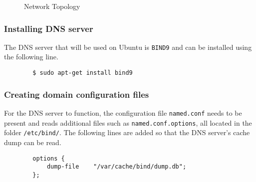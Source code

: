 \documentclass[a4paper,12pt]{article}
\begin{document}
\begin{figure}[H]
			\caption{Network Topology}
			\label{fig:Networksetup}
		\end{figure}
		\subsubsection{Installing DNS server}
		\begin{par} The DNS server that will be used on Ubuntu is \texttt{BIND9} and can be installed using the following line.
		\end{par}
		\begin{verbatim}
		$ sudo apt-get install bind9
		\end{verbatim}
		\subsubsection{Creating domain configuration files}
		\begin{par}
		For the DNS server to function, the configuration file \texttt{named.conf} needs to be present and reads additional files such as \texttt{named.conf.options}, all located in the folder \texttt{/etc/bind/}. The following lines are added so that the DNS server's cache dump can be read.
		\end{par}
		\begin{verbatim}
		options {
		    dump-file    "/var/cache/bind/dump.db";
		};
		\end{verbatim}
\end{document}
